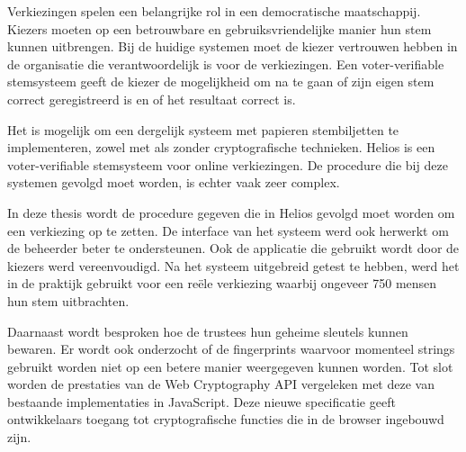 % 
%

Verkiezingen spelen een belangrijke rol in een democratische maatschappij. Kiezers moeten op een betrouwbare en gebruiksvriendelijke manier hun stem kunnen uitbrengen. Bij de huidige systemen moet de kiezer vertrouwen hebben in de organisatie die verantwoordelijk is voor de verkiezingen. Een voter-verifiable stemsysteem geeft de kiezer de mogelijkheid om na te gaan of zijn eigen stem correct geregistreerd is en of het resultaat correct is.

\npar Het is mogelijk om een dergelijk systeem met papieren stembiljetten te implementeren, zowel met als zonder cryptografische technieken. Helios is een voter-verifiable stemsysteem voor online verkiezingen. De procedure die bij deze systemen gevolgd moet worden, is echter vaak zeer complex.

\npar In deze thesis wordt de procedure gegeven die in Helios gevolgd moet worden om een verkiezing op te zetten. De interface van het systeem werd ook herwerkt om de beheerder beter te ondersteunen. Ook de applicatie die gebruikt wordt door de kiezers werd vereenvoudigd. Na het systeem uitgebreid getest te hebben, werd het in de praktijk gebruikt voor een re\"ele verkiezing waarbij ongeveer 750 mensen hun stem uitbrachten.

\npar Daarnaast wordt besproken hoe de trustees hun geheime sleutels kunnen bewaren. Er wordt ook onderzocht of de fingerprints waarvoor momenteel strings gebruikt worden niet op een betere manier weergegeven kunnen worden. Tot slot worden de prestaties van de Web Cryptography API vergeleken met deze van bestaande implementaties in JavaScript. Deze nieuwe specificatie geeft ontwikkelaars toegang tot cryptografische functies die in de browser ingebouwd zijn.